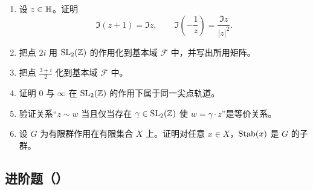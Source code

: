 \begin{enumerate}
  \item[\basic 20.] 设 $z\in\mathbb{H}$。证明
  \[
  \Im(z+1)=\Im z,
  \qquad
  \Im\!\left(-\frac1z\right)=\frac{\Im z}{|z|^2}.
  \]
  \item[\basic 21.] 把点 $2i$ 用 $\mathrm{SL}_2(\mathbb{Z})$ 的作用化到基本域 $\mathcal F$ 中，并写出所用矩阵。
  \item[\basic 22.] 把点 $\frac{3+i}{2}$ 化到基本域 $\mathcal F$ 中。
  \item[\basic 23.] 证明 $0$ 与 $\infty$ 在 $\mathrm{SL}_2(\mathbb{Z})$ 的作用下属于同一尖点轨道。
  \item[\basic 24.] 验证关系“$z\sim w$ 当且仅当存在 $\gamma\in\mathrm{SL}_2(\mathbb{Z})$ 使 $w=\gamma\cdot z$”是等价关系。
  \item[\basic 25.] 设 $G$ 为有限群作用在有限集合 $X$ 上。证明对任意 $x\in X$，$\operatorname{Stab}(x)$ 是 $G$ 的子群。
\end{enumerate}

\subsection*{进阶题（\medium）}

